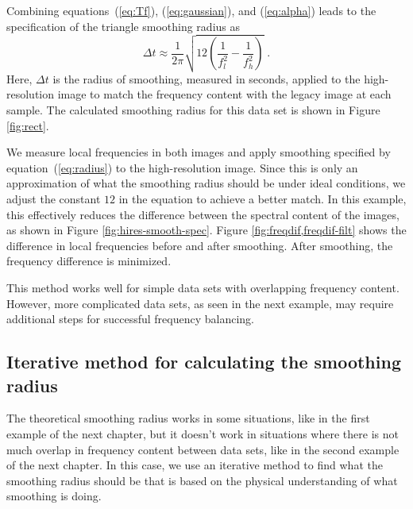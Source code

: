         Combining equations~(\ref{eq:Tf}), (\ref{eq:gaussian}), and (\ref{eq:alpha}) leads to the specification of the triangle smoothing radius as
        \begin{equation}
            \label{eq:radius}
            \Delta t \approx \frac{1}{2\pi}\sqrt{12\left(\frac{1}{f_{l}^{2}}-\frac{1}{f_{h}^{2}}\right)}\;.
        \end{equation}
        Here, $\Delta t$ is the radius of smoothing, measured in seconds, applied to the high-resolution image to match the frequency content with the legacy image at each sample. 
        The calculated smoothing radius for this data set is shown in Figure \ref{fig:rect}.
        
        
        We measure local frequencies in both images and apply smoothing specified by equation~(\ref{eq:radius}) to the high-resolution image.
        Since this is only an approximation of what the smoothing radius should be under ideal conditions, we adjust the constant $12$ in the equation to achieve a better match. 
        In this example, this effectively reduces the difference between the spectral content of the images, as shown in Figure \ref{fig:hires-smooth-spec}. 
        Figure \ref{fig:freqdif,freqdif-filt} shows the difference in local frequencies before and after smoothing. 
        After smoothing, the frequency difference is minimized. 
        
        This method works well for simple data sets with overlapping frequency content. 
        However, more complicated data sets, as seen in the next example, may require additional steps for successful frequency balancing.



        \subsection{Iterative method for calculating the smoothing radius}
        The theoretical smoothing radius works in some situations, like in the first example of the next chapter, but it doesn't work in situations where there is not much overlap in frequency content between data sets, like in the second example of the next chapter.
        In this case, we use an iterative method to find what the smoothing radius should be that is based on the physical understanding of what smoothing is doing.

